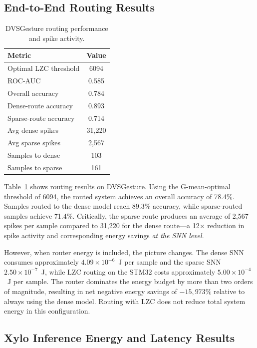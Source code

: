 \documentclass[conference]{IEEEtran}
\begin{document}
\subsection{End-to-End Routing Results}

\begin{table}[H]
\centering
\caption{DVSGesture routing performance and spike activity.}
\label{tab:routing}
\begin{tabular}{lc}
\toprule
Metric & Value \\
\midrule
Optimal LZC threshold & 6094 \\
ROC-AUC               & 0.585 \\
Overall accuracy      & 0.784 \\
Dense-route accuracy  & 0.893 \\
Sparse-route accuracy & 0.714 \\
Avg dense spikes      & 31,220 \\
Avg sparse spikes     & 2,567 \\
Samples to dense      & 103 \\
Samples to sparse     & 161 \\
\bottomrule
\end{tabular}
\end{table}

Table~\ref{tab:routing} shows routing results on DVSGesture. Using the G-mean-optimal threshold of 6094, the routed system achieves an overall accuracy of 78.4\%. Samples routed to the dense model reach 89.3\% accuracy, while sparse-routed samples achieve 71.4\%. Critically, the sparse route produces an average of 2,567 spikes per sample compared to 31,220 for the dense route—a 12$\times$ reduction in spike activity and corresponding energy savings \emph{at the SNN level}.

However, when router energy is included, the picture changes. The dense SNN consumes approximately $4.09\times10^{-6}$~J per sample and the sparse SNN $2.50\times10^{-7}$~J, while LZC routing on the STM32 costs approximately $5.00\times10^{-4}$~J per sample. The router dominates the energy budget by more than two orders of magnitude, resulting in net negative energy savings of $-15{,}973\%$ relative to always using the dense model. Routing with LZC does not reduce total system energy in this configuration.

\subsection{Xylo Inference Energy and Latency Results}
\end{document}
